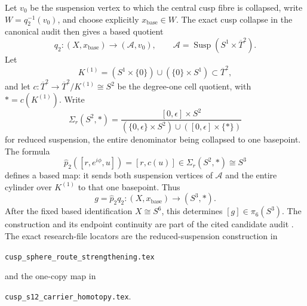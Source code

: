 Let \(v_0\) be the suspension vertex to which the central cusp fibre is
collapsed, write \(W=q_2^{-1}(v_0)\), and choose explicitly
\(x_{\mathrm{base}}\in W\).  The exact cusp collapse in the canonical audit
then gives a based quotient
\[
 q_2:(X,x_{\mathrm{base}})\longrightarrow
 (\mathcal A,v_0),\qquad
 \mathcal A=\operatorname{Susp}(S^1\times\overline T^2).
\]
Let
\[
 K^{(1)}=(S^1\times\{0\})\cup(\{0\}\times S^1)
 \subset\overline T^2,
\]
and let \(c:\overline T^2\to\overline T^2/K^{(1)}\cong S^2\) be the
degree-one cell quotient, with \(*=c(K^{(1)})\).  Write
\[
 \Sigma_r(S^2,*)=
 \frac{[0,\epsilon]\times S^2}
 { (\{0,\epsilon\}\times S^2)\cup([0,\epsilon]\times\{*\})}
\]
for reduced suspension, the entire denominator being collapsed to one
basepoint.  The formula
\[
 \widehat p_2([r,e^{i\phi},u])=[r,c(u)]
 \in\Sigma_r(S^2,*)\cong S^3
\]
defines a based map: it sends both suspension vertices of \(\mathcal A\)
and the entire cylinder over \(K^{(1)}\) to that one basepoint.  Thus
\begin{equation}
 g=\widehat p_2q_2:(X,x_{\mathrm{base}})\longrightarrow(S^3,*).
 \label{h24:eq:one-copy-g}
\end{equation}
After the fixed based identification \(X\cong S^6\), this determines
\([g]\in\pi_6(S^3)\).  The construction and its endpoint continuity are
part of the cited candidate audit \cite{h24:AlpogeS6_2026}.
The exact research-file locators are the reduced-suspension construction in
\begin{center}\small
\texttt{cusp\_sphere\_route\_strengthening.tex}
\end{center}
and the one-copy map in
\begin{center}\small
\texttt{cusp\_s12\_carrier\_homotopy.tex}.
\end{center}

